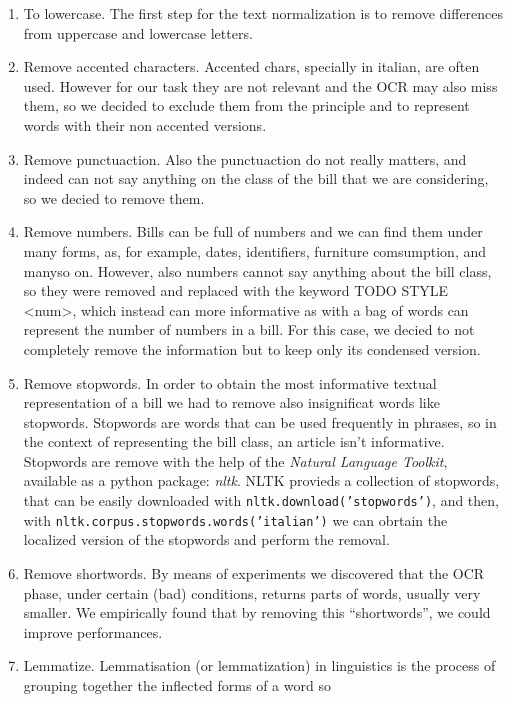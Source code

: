 \documentclass[10pt,twocolumn,letterpaper]{article}
\newcommand\codeinline[1]{\texttt{#1}}  %
\begin{document}
\begin{enumerate}
  \item To lowercase. The first step for the text normalization is to
    remove differences from uppercase and lowercase letters.
  \item Remove accented characters. Accented chars, specially in
    italian, are often used. However for our task they are not relevant
    and the OCR may also miss them, so we decided to exclude them from
    the principle and to represent words with their non accented
    versions.
  \item Remove punctuaction. Also the punctuaction do not really
    matters, and indeed can not say anything on the class of the bill
    that we are considering, so we decied to remove them.
  \item Remove numbers. Bills can be full of numbers and we can find
    them under many forms, as, for example, dates, identifiers,
    furniture comsumption, and manyso on. However, also numbers cannot
    say anything about the bill class, so they were removed and replaced
    with the keyword TODO STYLE <num>, which instead can more
    informative as with a bag of words can represent the number of
    numbers in a bill. For this case, we decied to not completely remove
    the information but to keep only its condensed version.
  \item Remove stopwords. In order to obtain the most informative
    textual representation of a bill we had to remove also
    insignificat words like stopwords. Stopwords are words that can be
    used frequently in phrases, so in the context of representing the
    bill class, an article isn't informative. Stopwords are remove
    with the help of the \emph{Natural Language Toolkit}, available as
    a python package: \emph{nltk}. NLTK provieds a collection of
    stopwords, that can be easily downloaded with
    \codeinline{nltk.download('stopwords')}, and then, with
    \codeinline{nltk.corpus.stopwords.words('italian')} we can obrtain the
    localized version of the stopwords and perform the removal.
  \item Remove shortwords. By means of experiments we discovered that
    the OCR phase, under certain (bad) conditions, returns parts of
    words, usually very smaller. We empirically found that by removing
    this ``shortwords'', we could improve performances.
  \item Lemmatize. Lemmatisation (or lemmatization) in linguistics is
    the process of grouping together the inflected forms of a word so

\end{enumerate}
\end{document}
